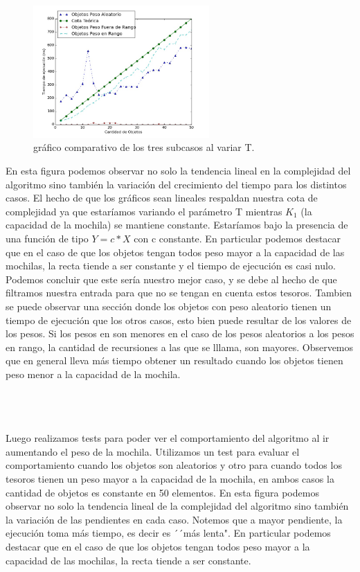 \documentclass[spanish,12pt]{article}
\begin{document}
{\begin{figure}[H]
\centering
\includegraphics[width=0.6\textwidth]{ObjMejorCasoVsAbjRangovsObjAl}
\caption{gráfico comparativo de los tres subcasos al variar T.}
\end{figure}


En esta figura podemos observar no solo la tendencia lineal en la complejidad del algoritmo sino también la variación del crecimiento del tiempo para los distintos casos.
El hecho de que los gráficos sean lineales respaldan nuestra cota de complejidad ya que estaríamos variando el parámetro T mientras $K_1$ (la capacidad de la mochila) se mantiene constante. Estaríamos bajo la presencia de una función de tipo $Y=c*X$ con c constante.
En particular podemos destacar que en el caso de que los objetos tengan todos peso mayor a la capacidad de las mochilas, la recta tiende a ser constante y el tiempo de ejecución es casi nulo.
Podemos concluir que este sería nuestro mejor caso, y se debe al hecho de que filtramos nuestra entrada para que no se tengan en cuenta estos tesoros.
Tambien se puede observar una sección donde los objetos con peso aleatorio tienen un tiempo de ejecución que los otros casos, esto bien puede resultar de los valores de los pesos. Si los pesos en son menores en el caso de los pesos aleatorios a los pesos en rango, la cantidad de recursiones a las que se lllama, son mayores.
Observemos que en general lleva más tiempo obtener un resultado cuando los objetos tienen peso menor a la capacidad de la mochila.

\\
\\
\\
Luego realizamos tests para poder ver el comportamiento del algoritmo al ir aumentando el peso de la mochila. Utilizamos un test para evaluar el comportamiento cuando los objetos son aleatorios y otro para cuando todos los tesoros tienen un peso mayor a la capacidad de la mochila, en ambos casos la cantidad de objetos es constante en 50 elementos.
En esta figura podemos observar no solo la tendencia lineal de la complejidad del algoritmo sino también la variación de las pendientes en cada caso. Notemos que a mayor pendiente, la ejecución toma más tiempo, es decir es ´´más lenta".
En particular podemos destacar que en el caso de que los objetos tengan todos peso mayor a la capacidad de las mochilas, la recta tiende a ser constante.

}
\end{document}

